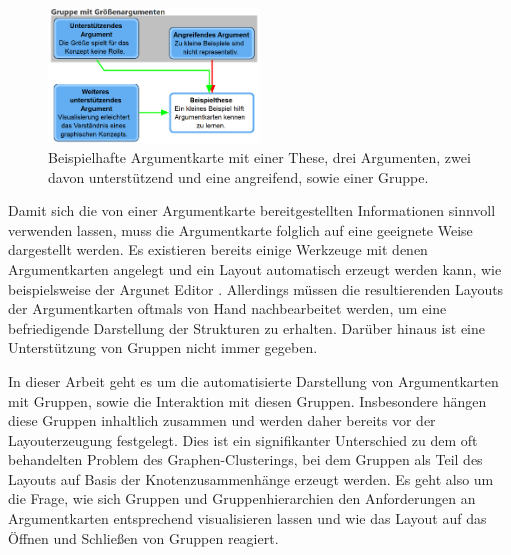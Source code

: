 \begin{figure}[h]
\begin{center}
	\includegraphics[width=0.5\textwidth]{Pics/Beispielargumentkarte.png}
	\caption{Beispielhafte Argumentkarte mit einer These, drei Argumenten, zwei davon unterstützend und eine angreifend, sowie einer Gruppe.}
	\label{f:Beispielargumentkarte}
\end{center}
\end{figure}

Damit sich die von einer Argumentkarte bereitgestellten Informationen sinnvoll verwenden lassen, muss die Argumentkarte folglich auf eine geeignete Weise dargestellt werden.
Es existieren bereits einige Werkzeuge mit denen Argumentkarten angelegt  und ein Layout automatisch erzeugt werden kann, wie beispielsweise der Argunet Editor \cite{argunet}. 
Allerdings müssen die resultierenden Layouts der Argumentkarten oftmals von Hand nachbearbeitet werden, um eine befriedigende Darstellung der Strukturen zu erhalten.
Darüber hinaus ist eine Unterstützung von Gruppen nicht immer gegeben. 

In dieser Arbeit geht es um die automatisierte Darstellung von Argumentkarten mit Gruppen, sowie die Interaktion mit diesen Gruppen. Insbesondere hängen diese Gruppen inhaltlich zusammen und werden daher bereits vor der Layouterzeugung festgelegt. Dies ist ein signifikanter Unterschied zu dem oft behandelten Problem des Graphen-Clusterings, bei dem Gruppen als Teil des Layouts auf Basis der Knotenzusammenhänge erzeugt werden.
Es geht also um die Frage, wie sich Gruppen und Gruppenhierarchien den Anforderungen an Argumentkarten entsprechend visualisieren lassen 
und wie das Layout auf das Öffnen und Schließen von Gruppen reagiert.


